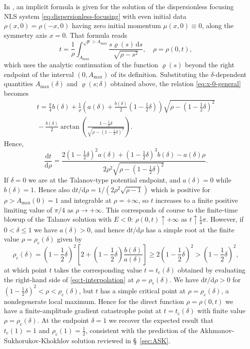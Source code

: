 \documentclass[12pt]{amsart}
\numberwithin{equation}{section}
\newcommand{\dd}{\mathrm{d}}
\newcommand{\evdensity}{\varrho}
\begin{document}
In \cite[Eqn.\@ (6.56)]{Kamvissis:2003}, an implicit formula is given for the solution of the dispersionless focusing NLS system \eqref{eq:dispersionless-focusing} with even initial data $\rho(x,0)=\rho(-x,0)$ having zero initial momentum $\mu(x,0)\equiv 0$, along the symmetry axis $x=0$.  That formula reads
\begin{equation}
t  =\frac{1}{\rho}\int_{A_\mathrm{max}}^{\sqrt{\rho}>A_\mathrm{max}}\frac{s\evdensity(s)\,\dd s}{\sqrt{\rho-s^2}},\quad \rho=\rho(0,t),
\label{eq:x-0-general}
\end{equation}
which uses the analytic continuation of the function $\evdensity(s)$ beyond the right endpoint of the interval $(0,A_\mathrm{max})$ of its definition.  Substituting the $\delta$-dependent quantities $A_\mathrm{max}(\delta)$ and $\evdensity(s;\delta)$ obtained above, the relation \eqref{eq:x-0-general} becomes
\begin{multline}
t=\frac{\pi}{4}b(\delta)+\frac{1}{\rho}\left(a(\delta) +
\frac{b(\delta)}{2}\left(1-\frac{1}{2}\delta\right)\right)\sqrt{\rho-\left(1-\frac{1}{2}\delta\right)^2}\\{}-\frac{b(\delta)}{2}\arctan\left(\frac{1-\frac{1}{2}\delta}{\sqrt{\rho-(1-\frac{1}{2}\delta)^2}}\right).
\label{eq:t-interpolation}
\end{multline}
Hence,
\begin{equation}
\frac{\dd t}{\dd\rho}=\frac{2(1-\frac{1}{2}\delta)^2a(\delta)+(1-\frac{1}{2}\delta)^3b(\delta)-a(\delta)\rho}{2\rho^2\sqrt{\rho-(1-\frac{1}{2}\delta)^2}}.
\end{equation}
If $\delta=0$ we are at the Talanov-type potential endpoint, and $a(\delta)=0$ while $b(\delta)=1$.  Hence also $\dd t/\dd\rho=1/(2\rho^2\sqrt{\rho-1})$ which is positive for $\rho>A_\mathrm{max}(0)=1$ and integrable at $\rho=+\infty$, so $t$ increases to a finite positive limiting value of $\pi/4$ as $\rho\to+\infty$.  This corresponds of course to the finite-time blowup of the Talanov solution with $E<0$:  $\rho(0,t)\uparrow +\infty$ as $t\uparrow \frac{1}{4}\pi$.  However, if $0<\delta\le 1$ we have $a(\delta)> 0$, and hence $\dd t/\dd\rho$ has a simple root at the finite value $\rho=\rho_\mathrm{c}(\delta)$ given by
\begin{equation}
\rho_\mathrm{c}(\delta)=\left(1-\frac{1}{2}\delta\right)^2\left[2+\left(1-\frac{1}{2}\delta\right)\frac{b(\delta)}{a(\delta)}\right]\ge 2\left(1-\frac{1}{2}\delta\right)^2>\left(1-\frac{1}{2}\delta\right)^2,
\end{equation}
at which point $t$ takes the corresponding value $t=t_\mathrm{c}(\delta)$ obtained by evaluating the right-hand side of \eqref{eq:t-interpolation} at $\rho=\rho_\mathrm{c}(\delta)$.  
We have $\dd t/\dd\rho>0$ for $(1-\frac{1}{2}\delta)^2<\rho<\rho_\mathrm{c}(\delta)$, but $t$ has a simple critical point at $\rho=\rho_\mathrm{c}(\delta)$, a nondegenerate local maximum.  Hence for the direct function $\rho=\rho(0,t)$ we have a finite-amplitude gradient catastrophe point at $t=t_\mathrm{c}(\delta)$ with finite value $\rho=\rho_\mathrm{c}(\delta)$.  At the endpoint $\delta=1$ we recover the expected result that $t_\mathrm{c}(1)=1$ and $\rho_\mathrm{c}(1)=\frac{1}{2}$, consistent with the prediction of the Akhmanov-Sukhorukov-Khokhlov solution reviewed in \S~\ref{sec:ASK}.
\end{document}
